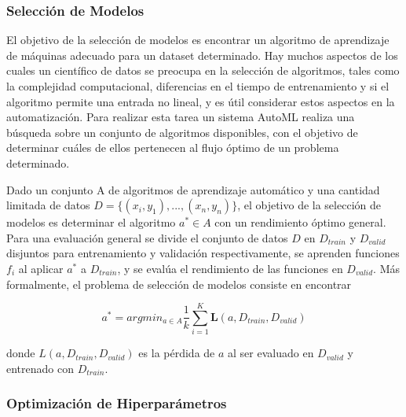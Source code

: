 \subsubsection{Selección de Modelos}

El objetivo de la selección de modelos es encontrar un algoritmo de aprendizaje de máquinas adecuado para un dataset determinado. Hay muchos aspectos de los cuales un científico de datos se preocupa en la selección de algoritmos, tales como la complejidad computacional, diferencias en el tiempo de entrenamiento y si el algoritmo permite una entrada no lineal, y es útil considerar estos aspectos en la automatización. Para realizar esta tarea un sistema AutoML realiza una búsqueda sobre un conjunto de algoritmos disponibles, con el objetivo de determinar cuáles de ellos pertenecen al flujo óptimo de un problema determinado.

\begin{definition}
	Dado un conjunto A de algoritmos de aprendizaje automático y una cantidad limitada de datos $D = \{(x_i, y_1),..., (x_n, y_n)\}$, el objetivo de la selección de modelos es determinar el algoritmo $a^* \in A$ con un rendimiento óptimo general. Para una evaluación general se divide el conjunto de datos $D$ en $D_{train}$ y $D_{valid}$ disjuntos para entrenamiento y validación respectivamente, se aprenden funciones $f_i$ al aplicar $a^*$ a $D_{train}$, y se evalúa el rendimiento de las funciones en $D_{valid}$. Más formalmente, el problema de selección de modelos consiste en encontrar

	\begin{equation}
		a^* = argmin_{a \in A}\dfrac{1}{k}\sum_{i=1}^K \textbf{L}(a, D_{train}, D_{valid})
	\end{equation}
	
	donde $L(a, D_{train}, D_{valid})$ es la pérdida de $a$ al ser evaluado en $D_{valid}$ y entrenado con $D_{train}$.
	

\end{definition}

\subsubsection{Optimización de Hiperparámetros}

